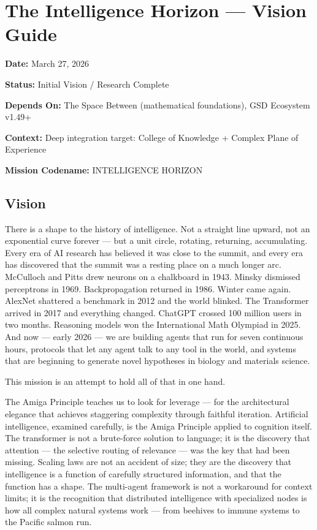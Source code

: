 \documentclass[11pt,letterpaper]{article}
\newcommand{\metafield}[2]{\textbf{\sffamily #1} #2\par}
\begin{document}
\section{The Intelligence Horizon --- Vision Guide}

\metafield{Date:}{March 27, 2026}
\metafield{Status:}{Initial Vision / Research Complete}
\metafield{Depends On:}{The Space Between (mathematical foundations), GSD Ecosystem v1.49+}
\metafield{Context:}{Deep integration target: College of Knowledge + Complex Plane of Experience}
\metafield{Mission Codename:}{INTELLIGENCE HORIZON}

\subsection{Vision}

There is a shape to the history of intelligence. Not a straight line upward, not an exponential curve forever — but a unit circle, rotating, returning, accumulating. Every era of AI research has believed it was close to the summit, and every era has discovered that the summit was a resting place on a much longer arc. McCulloch and Pitts drew neurons on a chalkboard in 1943. Minsky dismissed perceptrons in 1969. Backpropagation returned in 1986. Winter came again. AlexNet shattered a benchmark in 2012 and the world blinked. The Transformer arrived in 2017 and everything changed. ChatGPT crossed 100 million users in two months. Reasoning models won the International Math Olympiad in 2025. And now — early 2026 — we are building agents that run for seven continuous hours, protocols that let any agent talk to any tool in the world, and systems that are beginning to generate novel hypotheses in biology and materials science.

This mission is an attempt to hold all of that in one hand.

The Amiga Principle teaches us to look for leverage — for the architectural elegance that achieves staggering complexity through faithful iteration. Artificial intelligence, examined carefully, is the Amiga Principle applied to cognition itself. The transformer is not a brute-force solution to language; it is the discovery that attention — the selective routing of relevance — was the key that had been missing. Scaling laws are not an accident of size; they are the discovery that intelligence is a function of carefully structured information, and that the function has a shape. The multi-agent framework is not a workaround for context limits; it is the recognition that distributed intelligence with specialized nodes is how all complex natural systems work — from beehives to immune systems to the Pacific salmon run.
\end{document}
